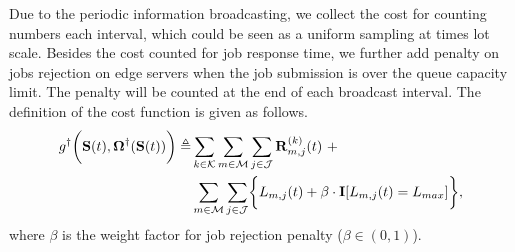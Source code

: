 Due to the periodic information broadcasting, we collect the cost for counting numbers each interval, which could be seen as a uniform sampling at times lot scale.
Besides the cost counted for job response time, we further add penalty on jobs rejection on edge servers when the job submission is over the queue capacity limit. The penalty will be counted at the end of each broadcast interval.
The definition of the cost function is given as follows.
\begin{align}
    g^{\dagger}\Paren{\Stat({t}), \Policy^{\dagger}(\Stat({t}))} \define
        &\sum_{k\in\apSet} \sum_{m\in\esSet} \sum_{j\in\jSpace} \vec{R}^{(k)}_{m,j}({t})~+
        \nonumber\\
        &\sum_{m\in\esSet} \sum_{j\in\jSpace} \Brace{L_{m,j}({t}) + \beta \cdot \mat{I}[L_{m,j}({t})=L_{max}]},
\end{align}
where $\beta$ is the weight factor for job rejection penalty ($\beta \in (0,1)$).

